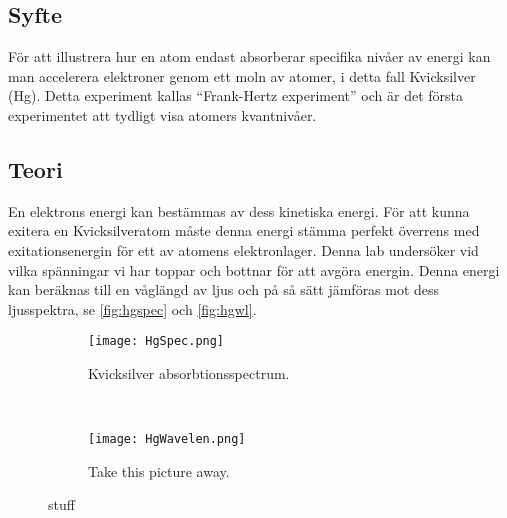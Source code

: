 \subsection*{Syfte}
För att illustrera hur en atom endast absorberar specifika nivåer av energi kan man accelerera elektroner genom ett moln av atomer, i detta fall Kvicksilver (Hg). 
Detta experiment kallas ``Frank-Hertz experiment'' och är det första experimentet att tydligt visa atomers kvantnivåer.

\subsection*{Teori}
En elektrons energi kan bestämmas av dess kinetiska energi. För att kunna exitera en Kvicksilveratom måste denna energi stämma perfekt överrens med exitationsenergin för ett av atomens elektronlager.
Denna lab undersöker vid vilka spänningar vi har toppar och bottnar för att avgöra energin. Denna energi kan beräknas till en våglängd av ljus och på så sätt jämföras mot dess ljusspektra, se \autoref{fig:hgspec} och \autoref{fig:hgwl}.

\begin{figure}[h]
	\centering
	\begin{subfigure}[c]{0.63\textwidth}
	\texttt{[image: HgSpec.png]}
	\caption{Kvicksilver absorbtionsspectrum.\cite{astronoo}}
	\label{fig:hgspec}
	\end{subfigure}
	~
	\begin{subfigure}[c]{0.32\textwidth}
	\texttt{[image: HgWavelen.png]}
	\caption{Take this picture away.}
	\label{fig:hgwl}
	\end{subfigure}
	\caption{stuff}\label{fig:hgstuff}
\end{figure}